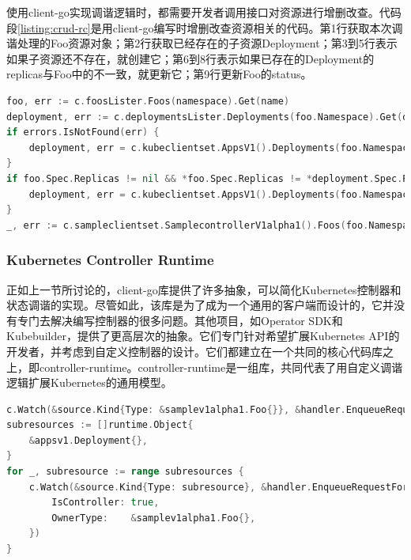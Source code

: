 \documentclass[macfonts,master]{njuthesis}
\begin{document}
使用client-go实现调谐逻辑时，都需要开发者调用接口对资源进行增删改查。代码段\ref{listing:crud-rc}是用client-go编写时增删改查资源相关的代码。第1行获取本次调谐处理的Foo资源对象；第2行获取已经存在的子资源Deployment；第3到5行表示如果子资源还不存在，就创建它；第6到8行表示如果已存在的Deployment的replicas与Foo中的不一致，就更新它；第9行更新Foo的status。
\begin{lstlisting}[language=Go,caption=sample-controller中对资源进行增删改查的代码段,label=listing:crud-rc]
foo, err := c.foosLister.Foos(namespace).Get(name)
deployment, err := c.deploymentsLister.Deployments(foo.Namespace).Get(deploymentName)
if errors.IsNotFound(err) {
    deployment, err = c.kubeclientset.AppsV1().Deployments(foo.Namespace).Create(context.TODO(), newDeployment(foo), metav1.CreateOptions{})
}
if foo.Spec.Replicas != nil && *foo.Spec.Replicas != *deployment.Spec.Replicas {
    deployment, err = c.kubeclientset.AppsV1().Deployments(foo.Namespace).Update(context.TODO(), newDeployment(foo), metav1.UpdateOptions{})
}
_, err := c.sampleclientset.SamplecontrollerV1alpha1().Foos(foo.Namespace).Update(context.TODO(), fooCopy, metav1.UpdateOptions{})
\end{lstlisting}

\subsubsection{Kubernetes Controller Runtime}

正如上一节所讨论的，client-go库提供了许多抽象，可以简化Kubernetes控制器和状态调谐的实现。尽管如此，该库是为了成为一个通用的客户端而设计的，它并没有专门去解决编写控制器的很多问题。其他项目，如Operator SDK和Kubebuilder，提供了更高层次的抽象。它们专门针对希望扩展Kubernetes API的开发者，并考虑到自定义控制器的设计。它们都建立在一个共同的核心代码库之上，即controller-runtime\cite{k8s-sigs}。controller-runtime是一组库，共同代表了用自定义调谐逻辑扩展Kubernetes的通用模型\cite{controllerruntimedoc}\cite{k8s-sigs}。


\begin{lstlisting}[language=Go,caption=controller-runtime版sample-controller中监视Foo和Deployment的代码段,label=listing:watch-foo-deploy-cr]
c.Watch(&source.Kind{Type: &samplev1alpha1.Foo{}}, &handler.EnqueueRequestForObject{})
subresources := []runtime.Object{
    &appsv1.Deployment{},
}
for _, subresource := range subresources {
    c.Watch(&source.Kind{Type: subresource}, &handler.EnqueueRequestForOwner{
        IsController: true,
        OwnerType:    &samplev1alpha1.Foo{},
    })
}
\end{lstlisting}
\end{document}
